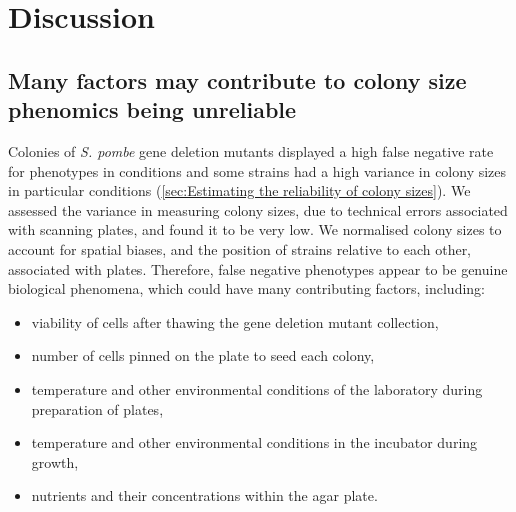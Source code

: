 \section{Discussion}

\subsection{Many factors may contribute to colony size phenomics being unreliable}

Colonies of \emph{S. pombe} gene deletion mutants displayed a high false negative rate for phenotypes in conditions and some strains had a high variance in colony sizes in particular conditions (\ref{sec:Estimating the reliability of colony sizes}). We assessed the variance in measuring colony sizes, due to technical errors associated with scanning plates, and found it to be very low. We normalised colony sizes to account for spatial biases, and the position of strains relative to each other, associated with plates. Therefore, false negative phenotypes appear to be genuine biological phenomena, which could have many contributing factors, including:

\begin{itemize}
    \item viability of cells after thawing the gene deletion mutant collection,
    \item number of cells pinned on the plate to seed each colony,
    \item temperature and other environmental conditions of the laboratory during preparation of plates,
    \item temperature and other environmental conditions in the incubator during growth,
    \item nutrients and their concentrations within the agar plate.
\end{itemize}

